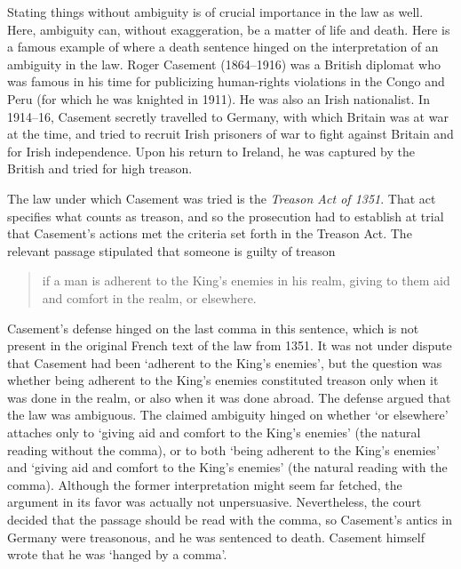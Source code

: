 Stating things without ambiguity is of crucial importance in the law as well. Here, ambiguity can, without exaggeration, be a matter of life and death. Here is a famous example of where a death sentence hinged on the interpretation of an ambiguity in the law. Roger Casement (1864--1916) was a British diplomat who was famous in his time for publicizing human-rights violations in the Congo and Peru (for which he was knighted in 1911). He was also an Irish nationalist. In 1914--16, Casement secretly travelled to Germany, with which Britain was at war at the time, and tried to recruit Irish prisoners of war to fight against Britain and for Irish independence. Upon his return to Ireland, he was captured by the British and tried for high treason.

The law under which Casement was tried is the \emph{Treason Act of 1351}. That act specifies what counts as treason, and so the prosecution had to establish at trial that Casement's actions met the criteria set forth in the Treason Act. The relevant passage stipulated that someone is guilty of treason
\begin{quote}
	if a man is adherent to the King's enemies in his
realm, giving to them aid and comfort in the realm, or elsewhere.
\end{quote}
Casement's defense hinged on the last comma in this sentence, which is not present in the original French text of the law from 1351.  It was not under dispute that Casement had been `adherent to the King's enemies', but the question was whether being adherent to the King's enemies constituted treason only when it was done in the realm, or also when it was done abroad. The defense argued that the law was ambiguous. The claimed ambiguity hinged on whether `or elsewhere' attaches only to `giving aid and comfort to the King's enemies' (the natural reading without the comma), or to both `being adherent to the King's enemies' and `giving aid and comfort to the King's enemies' (the natural reading with the comma).  Although the former interpretation might seem far fetched, the argument in its favor was actually not unpersuasive. Nevertheless, the court decided that the passage should be read with the comma, so Casement's antics in Germany were treasonous, and he was sentenced to death. Casement himself wrote that he was `hanged by a comma'.

